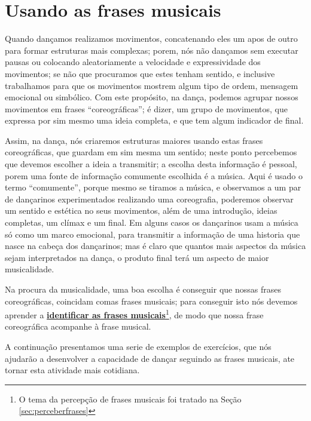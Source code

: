
\section{Usando as frases musicais}
Quando dançamos realizamos movimentos, 
concatenando eles um apos de outro para formar estruturas mais complexas;
porem, nós não dançamos sem executar pausas ou colocando aleatoriamente a velocidade 
e expressividade dos movimentos; 
se não que procuramos que estes tenham sentido, 
e inclusive trabalhamos para que os movimentos mostrem algum tipo de ordem, mensagem emocional ou simbólico.
Com este propósito, na dança, podemos agrupar nossos movimentos em frases ``coreográficas'';
é dizer, um grupo de movimentos, que expressa por sim mesmo uma ideia completa, 
e que tem algum indicador de final. 

Assim, na dança, 
nós criaremos estruturas maiores usando estas frases coreográficas, 
que guardam em sim mesma um sentido; 
neste ponto percebemos que devemos escolher a ideia a transmitir;
a escolha desta informação é pessoal, porem uma fonte de informação comumente escolhida é a música.
Aqui é usado o termo ``comumente'', porque mesmo se tiramos a música, 
e observamos a um par de dançarinos experimentados realizando uma coreografia, 
poderemos observar um sentido e estética no seus movimentos,
além de uma introdução, ideias completas, um clímax  e um final.
Em alguns casos os dançarinos usam a música só como um marco emocional,
para transmitir a informação de uma historia que nasce na cabeça dos dançarinos;
mas é claro que quantos mais aspectos da música sejam interpretados na dança,
o produto final terá um aspecto de maior musicalidade.

Na procura da musicalidade, uma boa escolha é conseguir que nossas frases coreográficas,
coincidam comas frases musicais;
para conseguir isto nós devemos aprender a 
\hyperref[sec:perceberfrases]{\textbf{identificar as frases musicais}}\footnote{O 
tema da percepção de frases musicais foi tratado na Seção \ref{sec:perceberfrases}},
de modo que  nossa frase coreográfica acompanhe à frase musical.

A continuação presentamos uma serie de exemplos de exercícios, 
que nós ajudarão a desenvolver a capacidade de dançar seguindo as frases musicais,
ate tornar esta atividade mais cotidiana.

